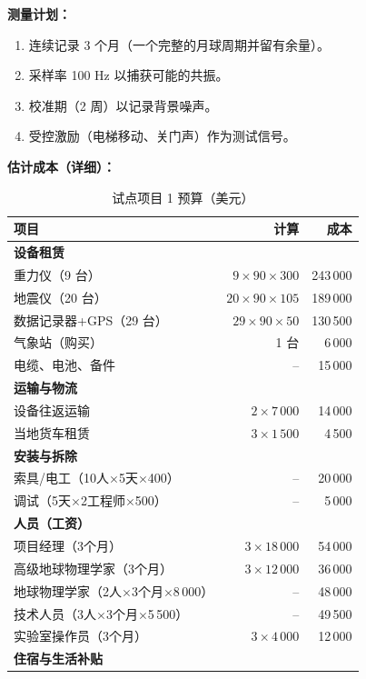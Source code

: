 \documentclass[12pt,a4paper]{article}
\theoremstyle{remark}
\begin{document}
	\textbf{测量计划：}
	\begin{enumerate}
		\item 连续记录 3 个月（一个完整的月球周期并留有余量）。
		\item 采样率 100 Hz 以捕获可能的共振。
		\item 校准期（2 周）以记录背景噪声。
		\item 受控激励（电梯移动、关门声）作为测试信号。
	\end{enumerate}
	
	\textbf{估计成本（详细）：}
	\begin{table}[htbp]
		\centering
		\caption{试点项目 1 预算（美元）}
		\label{tab:budget-building}
		\small
		\begin{tabular}{lrr}
			\toprule
			\textbf{项目} & \textbf{计算} & \textbf{成本} \\
			\midrule
			\multicolumn{3}{l}{\textbf{设备租赁}} \\
			重力仪（9 台） & $9\times90\times300$ & 243\,000 \\
			地震仪（20 台） & $20\times90\times105$ & 189\,000 \\
			数据记录器+GPS（29 台） & $29\times90\times50$ & 130\,500 \\
			气象站（购买） & 1 台 & 6\,000 \\
			电缆、电池、备件 & – & 15\,000 \\
			\multicolumn{3}{l}{\textbf{运输与物流}} \\
			设备往返运输 & $2\times7\,000$ & 14\,000 \\
			当地货车租赁 & $3\times1\,500$ & 4\,500 \\
			\multicolumn{3}{l}{\textbf{安装与拆除}} \\
			索具/电工（10人$\times$5天$\times$400） & – & 20\,000 \\
			调试（5天$\times$2工程师$\times$500） & – & 5\,000 \\
			\multicolumn{3}{l}{\textbf{人员（工资）}} \\
			项目经理（3个月） & $3\times18\,000$ & 54\,000 \\
			高级地球物理学家（3个月） & $3\times12\,000$ & 36\,000 \\
			地球物理学家（2人$\times$3个月$\times$8\,000） & – & 48\,000 \\
			技术人员（3人$\times$3个月$\times$5\,500） & – & 49\,500 \\
			实验室操作员（3个月） & $3\times4\,000$ & 12\,000 \\
			\multicolumn{3}{l}{\textbf{住宿与生活补贴}} \\

\end{tabular}
\end{table}
\end{document}

